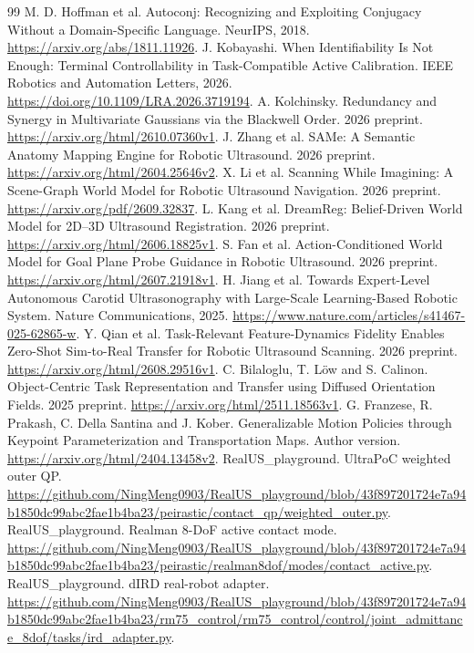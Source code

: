 \documentclass[UTF8,11pt,a4paper,fontset=fandol]{ctexart}
\numberwithin{equation}{section}
\theoremstyle{definition}
\begin{document}
\begin{thebibliography}{99}
 M. D. Hoffman et al. Autoconj: Recognizing and Exploiting Conjugacy Without a Domain-Specific Language. NeurIPS, 2018. \url{https://arxiv.org/abs/1811.11926}.
 J. Kobayashi. When Identifiability Is Not Enough: Terminal Controllability in Task-Compatible Active Calibration. IEEE Robotics and Automation Letters, 2026. \url{https://doi.org/10.1109/LRA.2026.3719194}.
 A. Kolchinsky. Redundancy and Synergy in Multivariate Gaussians via the Blackwell Order. 2026 preprint. \url{https://arxiv.org/html/2610.07360v1}.
 J. Zhang et al. SAMe: A Semantic Anatomy Mapping Engine for Robotic Ultrasound. 2026 preprint. \url{https://arxiv.org/html/2604.25646v2}.
 X. Li et al. Scanning While Imagining: A Scene-Graph World Model for Robotic Ultrasound Navigation. 2026 preprint. \url{https://arxiv.org/pdf/2609.32837}.
 L. Kang et al. DreamReg: Belief-Driven World Model for 2D--3D Ultrasound Registration. 2026 preprint. \url{https://arxiv.org/html/2606.18825v1}.
 S. Fan et al. Action-Conditioned World Model for Goal Plane Probe Guidance in Robotic Ultrasound. 2026 preprint. \url{https://arxiv.org/html/2607.21918v1}.
 H. Jiang et al. Towards Expert-Level Autonomous Carotid Ultrasonography with Large-Scale Learning-Based Robotic System. Nature Communications, 2025. \url{https://www.nature.com/articles/s41467-025-62865-w}.
 Y. Qian et al. Task-Relevant Feature-Dynamics Fidelity Enables Zero-Shot Sim-to-Real Transfer for Robotic Ultrasound Scanning. 2026 preprint. \url{https://arxiv.org/html/2608.29516v1}.
 C. Bilaloglu, T. L\"ow and S. Calinon. Object-Centric Task Representation and Transfer using Diffused Orientation Fields. 2025 preprint. \url{https://arxiv.org/html/2511.18563v1}.
 G. Franzese, R. Prakash, C. Della Santina and J. Kober. Generalizable Motion Policies through Keypoint Parameterization and Transportation Maps. Author version. \url{https://arxiv.org/html/2404.13458v2}.
 RealUS\_playground. UltraPoC weighted outer QP. \url{https://github.com/NingMeng0903/RealUS_playground/blob/43f897201724e7a94b1850dc99abc2fae1b4ba23/peirastic/contact_qp/weighted_outer.py}.
 RealUS\_playground. Realman 8-DoF active contact mode. \url{https://github.com/NingMeng0903/RealUS_playground/blob/43f897201724e7a94b1850dc99abc2fae1b4ba23/peirastic/realman8dof/modes/contact_active.py}.
 RealUS\_playground. dIRD real-robot adapter. \url{https://github.com/NingMeng0903/RealUS_playground/blob/43f897201724e7a94b1850dc99abc2fae1b4ba23/rm75_control/rm75_control/control/joint_admittance_8dof/tasks/ird_adapter.py}.

\end{thebibliography}
\end{document}
